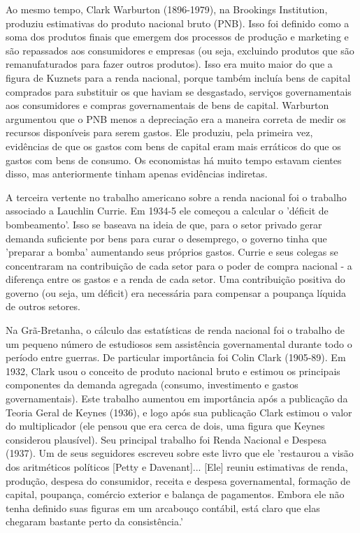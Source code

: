 \documentclass[12pt]{article}
\begin{document}
Ao mesmo tempo, Clark Warburton (1896-1979), na Brookings Institution, produziu estimativas do produto nacional bruto (PNB). Isso foi definido como a soma dos produtos finais que emergem dos processos de produção e marketing e são repassados aos consumidores e empresas (ou seja, excluindo produtos que são remanufaturados para fazer outros produtos). Isso era muito maior do que a figura de Kuznets para a renda nacional, porque também incluía bens de capital comprados para substituir os que haviam se desgastado, serviços governamentais aos consumidores e compras governamentais de bens de capital. Warburton argumentou que o PNB menos a depreciação era a maneira correta de medir os recursos disponíveis para serem gastos. Ele produziu, pela primeira vez, evidências de que os gastos com bens de capital eram mais erráticos do que os gastos com bens de consumo. Os economistas há muito tempo estavam cientes disso, mas anteriormente tinham apenas evidências indiretas.

A terceira vertente no trabalho americano sobre a renda nacional foi o trabalho associado a Lauchlin Currie. Em 1934-5 ele começou a calcular o 'déficit de bombeamento'. Isso se baseava na ideia de que, para o setor privado gerar demanda suficiente por bens para curar o desemprego, o governo tinha que 'preparar a bomba' aumentando seus próprios gastos. Currie e seus colegas se concentraram na contribuição de cada setor para o poder de compra nacional - a diferença entre os gastos e a renda de cada setor. Uma contribuição positiva do governo (ou seja, um déficit) era necessária para compensar a poupança líquida de outros setores.

Na Grã-Bretanha, o cálculo das estatísticas de renda nacional foi o trabalho de um pequeno número de estudiosos sem assistência governamental durante todo o período entre guerras. De particular importância foi Colin Clark (1905-89). Em 1932, Clark usou o conceito de produto nacional bruto e estimou os principais componentes da demanda agregada (consumo, investimento e gastos governamentais). Este trabalho aumentou em importância após a publicação da Teoria Geral de Keynes (1936), e logo após sua publicação Clark estimou o valor do multiplicador (ele pensou que era cerca de dois, uma figura que Keynes considerou plausível). Seu principal trabalho foi Renda Nacional e Despesa (1937). Um de seus seguidores escreveu sobre este livro que ele 'restaurou a visão dos aritméticos políticos [Petty e Davenant]... [Ele] reuniu estimativas de renda, produção, despesa do consumidor, receita e despesa governamental, formação de capital, poupança, comércio exterior e balança de pagamentos. Embora ele não tenha definido suas figuras em um arcabouço contábil, está claro que elas chegaram bastante perto da consistência.'
\end{document}

